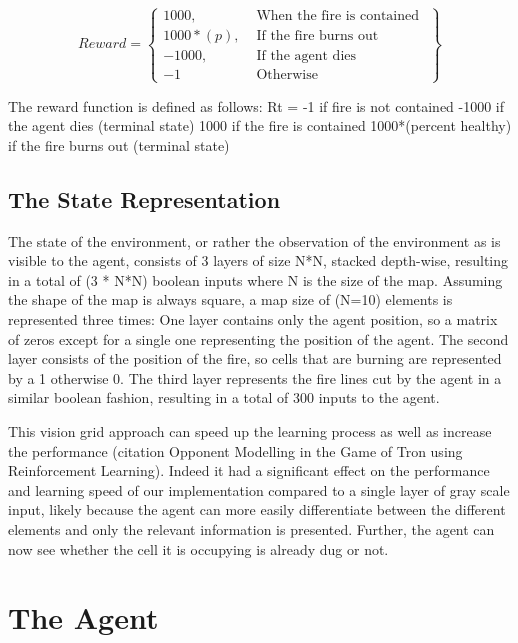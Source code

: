 \[
Reward = \left\{\begin{array}{lr}
    1000, & \text{ When the fire is contained }\\
    1000 * (p), & \text{ If the fire burns out }\\
    -1000, & \text{ If the agent dies }\\
    -1 & \text{ Otherwise }

    \end{array}\right\}
\]

The reward function is defined as follows:
Rt = -1 if fire is not contained
    -1000 if the agent dies (terminal state)
    1000 if the fire is contained
    1000*(percent healthy) if the fire burns out (terminal state)

\subsection{The State Representation}\label{sec:state_rep}
The state of the environment, or rather the observation of the environment as is visible to the agent, consists of 3 layers of size N*N, stacked depth-wise, resulting in a total of (3 * N*N) boolean inputs where N is the size of the map. Assuming the shape of the map is always square, a map size of (N=10) elements is represented three times: One layer contains only the agent position, so a matrix of zeros except for a single one representing the position of the agent. The second layer consists of the position of the fire, so cells that are burning are represented by a 1 otherwise 0. The third layer represents the fire lines cut by the agent in a similar boolean fashion, resulting in a total of 300 inputs to the agent.

This vision grid approach can speed up the learning process as well as increase the performance (citation Opponent Modelling in the Game of Tron using Reinforcement Learning). Indeed it had a significant effect on the performance and learning speed of our implementation compared to a single layer of gray scale input, likely because the agent can more easily differentiate between the different elements and only the relevant information is presented. Further, the agent can now see whether the cell it is occupying is already dug or not.





\section{The Agent}\label{sec:agent}

